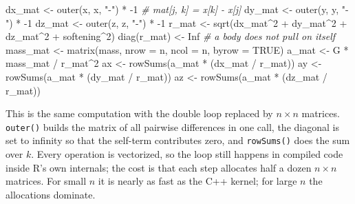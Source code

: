\documentclass[
  10.5pt,
  letterpaper,
]{scrbook}
\newenvironment{Shaded}{\begin{snugshade}}{\end{snugshade}}
\newcommand{\AttributeTok}[1]{\textcolor[rgb]{0.00,0.00,0.00}{#1}}
\newcommand{\CommentTok}[1]{\textcolor[rgb]{0.00,0.00,0.00}{\textit{#1}}}
\newcommand{\ConstantTok}[1]{\textcolor[rgb]{0.00,0.00,0.00}{#1}}
\newcommand{\DecValTok}[1]{\textcolor[rgb]{0.00,0.00,0.00}{#1}}
\newcommand{\FunctionTok}[1]{\textcolor[rgb]{0.00,0.00,0.00}{#1}}
\newcommand{\NormalTok}[1]{\textcolor[rgb]{0.00,0.00,0.00}{#1}}
\newcommand{\OtherTok}[1]{\textcolor[rgb]{0.00,0.00,0.00}{#1}}
\newcommand{\SpecialCharTok}[1]{\textcolor[rgb]{0.00,0.00,0.00}{#1}}
\newcommand{\StringTok}[1]{\textcolor[rgb]{0.00,0.00,0.00}{#1}}
\theoremstyle{definition}
\theoremstyle{plain}
\theoremstyle{remark}
\begin{document}
\begin{Shaded}
\begin{Highlighting}[]
\NormalTok{dx\_mat }\OtherTok{\textless{}{-}} \FunctionTok{outer}\NormalTok{(x, x, }\StringTok{"{-}"}\NormalTok{) }\SpecialCharTok{*} \SpecialCharTok{{-}}\DecValTok{1}          \CommentTok{\# mat[j, k] = x[k] {-} x[j]}
\NormalTok{dy\_mat }\OtherTok{\textless{}{-}} \FunctionTok{outer}\NormalTok{(y, y, }\StringTok{"{-}"}\NormalTok{) }\SpecialCharTok{*} \SpecialCharTok{{-}}\DecValTok{1}
\NormalTok{dz\_mat }\OtherTok{\textless{}{-}} \FunctionTok{outer}\NormalTok{(z, z, }\StringTok{"{-}"}\NormalTok{) }\SpecialCharTok{*} \SpecialCharTok{{-}}\DecValTok{1}
\NormalTok{r\_mat  }\OtherTok{\textless{}{-}} \FunctionTok{sqrt}\NormalTok{(dx\_mat}\SpecialCharTok{\^{}}\DecValTok{2} \SpecialCharTok{+}\NormalTok{ dy\_mat}\SpecialCharTok{\^{}}\DecValTok{2} \SpecialCharTok{+}\NormalTok{ dz\_mat}\SpecialCharTok{\^{}}\DecValTok{2} \SpecialCharTok{+}\NormalTok{ softening}\SpecialCharTok{\^{}}\DecValTok{2}\NormalTok{)}
\FunctionTok{diag}\NormalTok{(r\_mat) }\OtherTok{\textless{}{-}} \ConstantTok{Inf}                        \CommentTok{\# a body does not pull on itself}
\NormalTok{mass\_mat }\OtherTok{\textless{}{-}} \FunctionTok{matrix}\NormalTok{(mass, }\AttributeTok{nrow =}\NormalTok{ n, }\AttributeTok{ncol =}\NormalTok{ n, }\AttributeTok{byrow =} \ConstantTok{TRUE}\NormalTok{)}
\NormalTok{a\_mat }\OtherTok{\textless{}{-}}\NormalTok{ G }\SpecialCharTok{*}\NormalTok{ mass\_mat }\SpecialCharTok{/}\NormalTok{ r\_mat}\SpecialCharTok{\^{}}\DecValTok{2}
\NormalTok{ax }\OtherTok{\textless{}{-}} \FunctionTok{rowSums}\NormalTok{(a\_mat }\SpecialCharTok{*}\NormalTok{ (dx\_mat }\SpecialCharTok{/}\NormalTok{ r\_mat))}
\NormalTok{ay }\OtherTok{\textless{}{-}} \FunctionTok{rowSums}\NormalTok{(a\_mat }\SpecialCharTok{*}\NormalTok{ (dy\_mat }\SpecialCharTok{/}\NormalTok{ r\_mat))}
\NormalTok{az }\OtherTok{\textless{}{-}} \FunctionTok{rowSums}\NormalTok{(a\_mat }\SpecialCharTok{*}\NormalTok{ (dz\_mat }\SpecialCharTok{/}\NormalTok{ r\_mat))}
\end{Highlighting}
\end{Shaded}

This is the same computation with the double loop replaced by
\(n \times n\) matrices. \texttt{outer()} builds the matrix of all
pairwise differences in one call, the diagonal is set to infinity so
that the self-term contributes zero, and \texttt{rowSums()} does the sum
over \(k\). Every operation is vectorized, so the loop still happens in
compiled code inside R's own internals; the cost is that each step
allocates half a dozen \(n\times n\) matrices. For small \(n\) it is
nearly as fast as the C++ kernel; for large \(n\) the allocations
dominate.
\end{document}
